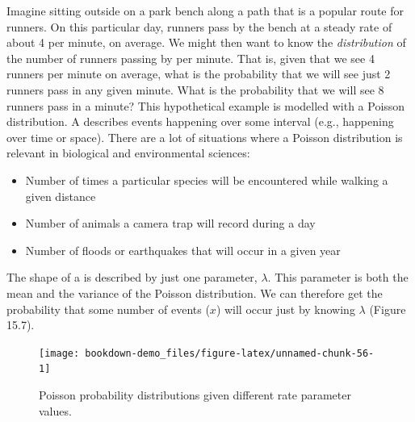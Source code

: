 \documentclass[
  openany]{krantz}
\providecommand{\tightlist}{%
  \setlength{\itemsep}{0pt}\setlength{\parskip}{0pt}}
\begin{document}
Imagine sitting outside on a park bench along a path that is a popular route for runners.
On this particular day, runners pass by the bench at a steady rate of about 4 per minute, on average.
We might then want to know the \emph{distribution} of the number of runners passing by per minute.
That is, given that we see 4 runners per minute on average, what is the probability that we will see just 2 runners pass in any given minute.
What is the probability that we will see 8 runners pass in a minute?
This hypothetical example is modelled with a Poisson distribution.
A  describes events happening over some interval (e.g., happening over time or space).
There are a lot of situations where a Poisson distribution is relevant in biological and environmental sciences:

\begin{itemize}
\tightlist
\item
  Number of times a particular species will be encountered while walking a given distance
\item
  Number of animals a camera trap will record during a day
\item
  Number of floods or earthquakes that will occur in a given year
\end{itemize}

The shape of a  is described by just one parameter, \(\lambda\).
This parameter is both the mean and the variance of the Poisson distribution.
We can therefore get the probability that some number of events (\(x\)) will occur just by knowing \(\lambda\) (Figure 15.7).

\begin{figure}
\texttt{[image: bookdown-demo\_files/figure-latex/unnamed-chunk-56-1]} \caption{Poisson probability distributions given different rate parameter values.}\label{fig:unnamed-chunk-56}
\end{figure}

\newpage
\end{document}

